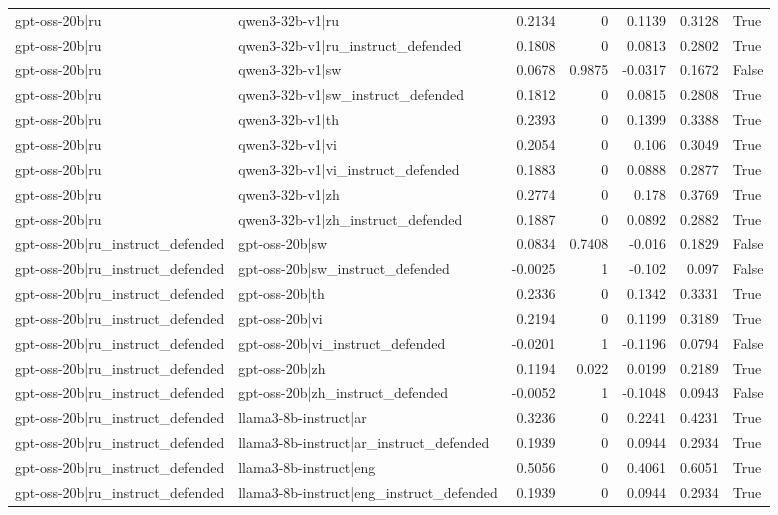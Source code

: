 \begin{table}
\begin{tabular}{l l r r r r l}
gpt-oss-20b|ru & qwen3-32b-v1|ru & 0.2134 & 0 & 0.1139 & 0.3128 & True \\
gpt-oss-20b|ru & qwen3-32b-v1|ru_instruct_defended & 0.1808 & 0 & 0.0813 & 0.2802 & True \\
gpt-oss-20b|ru & qwen3-32b-v1|sw & 0.0678 & 0.9875 & -0.0317 & 0.1672 & False \\
gpt-oss-20b|ru & qwen3-32b-v1|sw_instruct_defended & 0.1812 & 0 & 0.0815 & 0.2808 & True \\
gpt-oss-20b|ru & qwen3-32b-v1|th & 0.2393 & 0 & 0.1399 & 0.3388 & True \\
gpt-oss-20b|ru & qwen3-32b-v1|vi & 0.2054 & 0 & 0.106 & 0.3049 & True \\
gpt-oss-20b|ru & qwen3-32b-v1|vi_instruct_defended & 0.1883 & 0 & 0.0888 & 0.2877 & True \\
gpt-oss-20b|ru & qwen3-32b-v1|zh & 0.2774 & 0 & 0.178 & 0.3769 & True \\
gpt-oss-20b|ru & qwen3-32b-v1|zh_instruct_defended & 0.1887 & 0 & 0.0892 & 0.2882 & True \\
gpt-oss-20b|ru_instruct_defended & gpt-oss-20b|sw & 0.0834 & 0.7408 & -0.016 & 0.1829 & False \\
gpt-oss-20b|ru_instruct_defended & gpt-oss-20b|sw_instruct_defended & -0.0025 & 1 & -0.102 & 0.097 & False \\
gpt-oss-20b|ru_instruct_defended & gpt-oss-20b|th & 0.2336 & 0 & 0.1342 & 0.3331 & True \\
gpt-oss-20b|ru_instruct_defended & gpt-oss-20b|vi & 0.2194 & 0 & 0.1199 & 0.3189 & True \\
gpt-oss-20b|ru_instruct_defended & gpt-oss-20b|vi_instruct_defended & -0.0201 & 1 & -0.1196 & 0.0794 & False \\
gpt-oss-20b|ru_instruct_defended & gpt-oss-20b|zh & 0.1194 & 0.022 & 0.0199 & 0.2189 & True \\
gpt-oss-20b|ru_instruct_defended & gpt-oss-20b|zh_instruct_defended & -0.0052 & 1 & -0.1048 & 0.0943 & False \\
gpt-oss-20b|ru_instruct_defended & llama3-8b-instruct|ar & 0.3236 & 0 & 0.2241 & 0.4231 & True \\
gpt-oss-20b|ru_instruct_defended & llama3-8b-instruct|ar_instruct_defended & 0.1939 & 0 & 0.0944 & 0.2934 & True \\
gpt-oss-20b|ru_instruct_defended & llama3-8b-instruct|eng & 0.5056 & 0 & 0.4061 & 0.6051 & True \\
gpt-oss-20b|ru_instruct_defended & llama3-8b-instruct|eng_instruct_defended & 0.1939 & 0 & 0.0944 & 0.2934 & True \\

\end{tabular}
\end{table}
